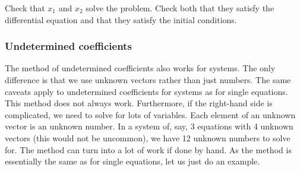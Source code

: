 \begin{exercise}
Check that $x_1$ and $x_2$ solve the problem.  Check both that they satisfy
the differential equation and that they satisfy the initial conditions.
\end{exercise}

\subsubsection{Undetermined coefficients}

The method of
undetermined coefficients also
works for systems.
The only
difference is that we use unknown vectors rather than just
numbers.  The same caveats apply to undetermined coefficients for systems
as for single equations.  This method does not always work.
Furthermore, if the right-hand side is complicated, we need to solve
for lots of
variables.  Each element of an
unknown vector is an unknown number.  In a system of, say, 3 equations with
4 unknown vectors (this would not be uncommon), we have 12
unknown numbers to solve for.
The method can turn into a lot of
work if done by hand.
As the method is essentially the same as for single equations,
let us just do an example.

